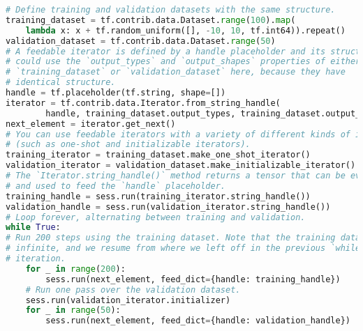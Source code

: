 \begin{lstlisting}[language=Python]
# Define training and validation datasets with the same structure.
training_dataset = tf.contrib.data.Dataset.range(100).map(
    lambda x: x + tf.random_uniform([], -10, 10, tf.int64)).repeat()
validation_dataset = tf.contrib.data.Dataset.range(50)
# A feedable iterator is defined by a handle placeholder and its structure. We
# could use the `output_types` and `output_shapes` properties of either
# `training_dataset` or `validation_dataset` here, because they have
# identical structure.
handle = tf.placeholder(tf.string, shape=[])
iterator = tf.contrib.data.Iterator.from_string_handle(
        handle, training_dataset.output_types, training_dataset.output_shapes)
next_element = iterator.get_next()
# You can use feedable iterators with a variety of different kinds of iterator
# (such as one-shot and initializable iterators).
training_iterator = training_dataset.make_one_shot_iterator()
validation_iterator = validation_dataset.make_initializable_iterator()
# The `Iterator.string_handle()` method returns a tensor that can be evaluated
# and used to feed the `handle` placeholder.
training_handle = sess.run(training_iterator.string_handle())
validation_handle = sess.run(validation_iterator.string_handle())
# Loop forever, alternating between training and validation.
while True:
# Run 200 steps using the training dataset. Note that the training dataset is
# infinite, and we resume from where we left off in the previous `while` loop
# iteration.
    for _ in range(200):
        sess.run(next_element, feed_dict={handle: training_handle})
    # Run one pass over the validation dataset.
    sess.run(validation_iterator.initializer)
    for _ in range(50):
        sess.run(next_element, feed_dict={handle: validation_handle})
\end{lstlisting}
